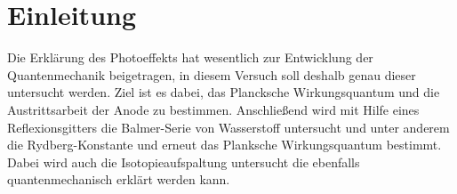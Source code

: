 \section{Einleitung}
Die Erklärung des Photoeffekts hat wesentlich zur Entwicklung der Quantenmechanik beigetragen,
in diesem Versuch soll deshalb genau dieser untersucht werden. Ziel ist es dabei, das Plancksche Wirkungsquantum und die Austrittsarbeit der Anode zu bestimmen. Anschließend wird mit Hilfe eines Reflexionsgitters die Balmer-Serie von Wasserstoff untersucht und unter anderem die Rydberg-Konstante und erneut das Planksche Wirkungsquantum bestimmt. Dabei wird auch die Isotopieaufspaltung untersucht die ebenfalls quantenmechanisch erklärt werden kann.
